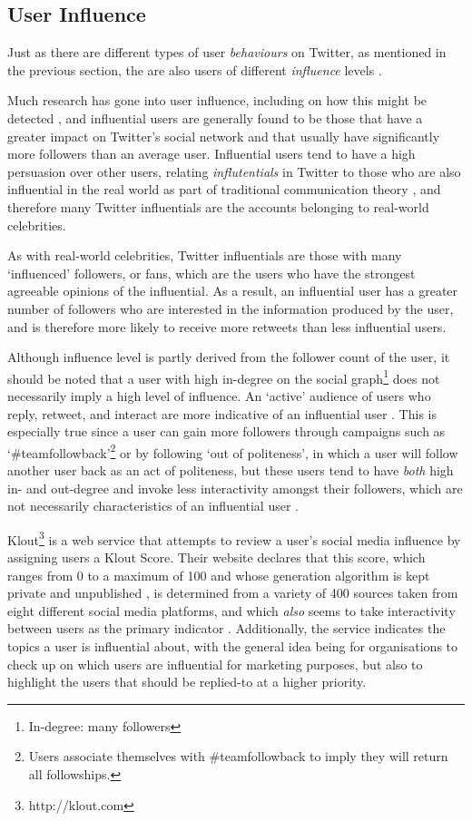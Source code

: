 \subsection{User Influence}
Just as there are different types of user \textit{behaviours} on Twitter, as mentioned in the previous section, the are also users of different \textit{influence} levels \cite{quercia11}.

Much research has gone into user influence, including on how this might be detected \cite{yu11}, and influential users are generally found to be those that have a greater impact on Twitter's social network \cite{bakshy11} and that usually have significantly more followers than an average user. Influential users tend to have a high persuasion over other users, relating \textit{influtentials} in Twitter to those who are also influential in the real world as part of traditional communication theory \cite{cha10}, and therefore many Twitter influentials are the accounts belonging to real-world celebrities.

As with real-world celebrities, Twitter influentials are those with many `influenced' followers, or fans, which are the users who have the strongest agreeable opinions of the influential. As a result, an influential user has a greater number of followers who are interested in the information produced by the user, and is therefore more likely to receive more retweets than less influential users.

Although influence level is partly derived from the follower count of the user, it should be noted that a user with high in-degree on the social graph\footnote{In-degree: many followers} does not necessarily imply a high level of influence. An `active' audience of users who reply, retweet, and interact are more indicative of an influential user \cite{bigonha10}. This is especially true since a user can gain more followers through campaigns such as `\#teamfollowback'\footnote{Users associate themselves with \#teamfollowback to imply they will return all followships.} or by following `out of politeness', in which a user will follow another user back as an act of politeness, but these users tend to have \textit{both} high in- and out-degree and invoke less interactivity amongst their followers, which are not necessarily characteristics of an influential user \cite{cha10}.

Klout\footnote{http://klout.com} is a web service that attempts to review a user's social media influence by assigning users a Klout Score. Their website declares that this score, which ranges from 0 to a maximum of 100 and whose generation algorithm is kept private and unpublished \cite{edwards13}, is determined from a variety of 400 sources taken from eight different social media platforms, and which \textit{also} seems to take interactivity between users as the primary indicator \cite{anger11}. Additionally, the service indicates the topics a user is influential about, with the general idea being for organisations to check up on which users are influential for marketing purposes, but also to highlight the users that should be replied-to at a higher priority.


